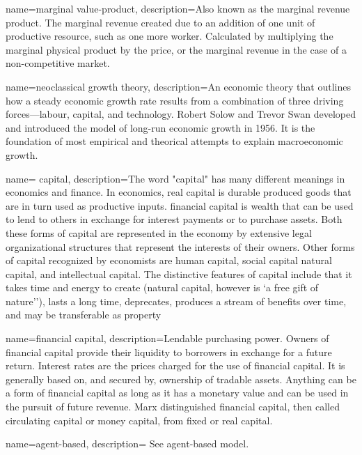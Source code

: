 {
name=marginal value-product,
description={Also known as the marginal revenue product. The marginal revenue created due to an addition of one unit of productive resource, such as one more worker. Calculated by multiplying the marginal physical product by the price, or the marginal revenue in the case of a non-competitive market.}
}

{
name=neoclassical growth theory,
description={An economic theory that outlines how a steady economic growth rate results from a combination of three driving forces---labour, capital, and technology. Robert Solow and Trevor Swan developed and introduced the model of long-run economic growth in 1956. It is the  foundation of most empirical and theorical attempts to explain macroeconomic growth.}
}


{
name= capital,
description={The word "capital" has many different meanings in economics and finance.  In economics, real capital is durable produced goods that are in turn used as productive inputs. \Gls{financial capital} is wealth that can be used to lend to others in exchange for interest payments or to purchase assets. Both these forms of capital are represented in the economy by extensive legal organizational structures that represent the interests of their owners. Other forms of capital recognized by economists are human capital, social capital natural capital, and intellectual capital. The distinctive  features of capital include that it takes time and energy to create (natural capital, however is  `a free gift of nature''), lasts a long time, deprecates, produces a stream of benefits over time,  and may be transferable as property}
}

{
name=financial capital,
description={Lendable purchasing power. Owners of financial capital provide their liquidity to borrowers in exchange for a future return. Interest rates are the prices charged for the use of financial capital. It is generally based on, and  secured by, ownership of tradable assets. Anything can be a form of financial capital as long as it has a monetary value and can be used in the pursuit of future revenue. Marx distinguished financial capital, then called circulating capital or money capital, from fixed or real capital.}
}

{
name=agent-based,
description={%
See \gls{agent-based model}.}
}

